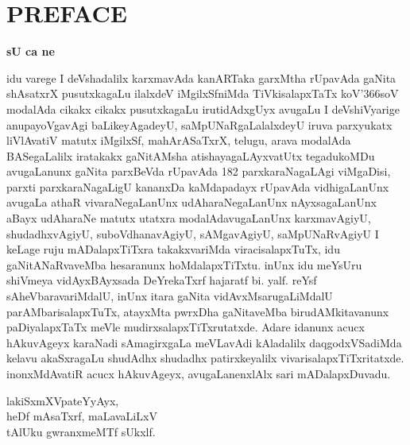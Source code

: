 \chapter{{\rm\bfseries PREFACE}}

\begin{center}
{\LARGE\bfseries sU ca ne}
\end{center}

idu varege I deVshadalilx karxmavAda kanARTaka garxMtha rUpavAda gaNita shAsatxrX pusutxkagaLu ilalxdeV iMgilxSfniMda TiVkisalapxTaTx koV\char'366soV modalAda cikakx cikakx pusutxkagaLu irutidAdxgUyx avugaLu I deVshiVyarige anupayoVgavAgi baLikeyAgadeyU, saMpUNaRgaLalalxdeyU iruva parxyukatx liVlAvatiV matutx iMgilxSf, mahArASaTxrX, telugu, arava modalAda BASegaLalilx iratakakx gaNitAMsha atishayagaLAyxvatUtx tegadukoMDu avugaLanunx gaNita parxBeVda rUpavAda {\rm 182} parxkaraNagaLAgi viMgaDisi, parxti parxkaraNagaLigU kananxDa kaMdapadayx rUpavAda vidhigaLanUnx avugaLa athaR vivaraNegaLanUnx udAharaNegaLanUnx nAyxsagaLanUnx aBayx udAharaNe matutx utatxra modalAdavugaLanUnx karxmavAgiyU, shudadhxvAgiyU, suboVdhanavAgiyU, sAMgavAgiyU, saMpUNaRvAgiyU I keLage ruju mADalapxTiTxra takakxvariMda viracisalapxTuTx, idu gaNitANaRvaveMba hesaranunx hoMdalapxTiTxtu. inUnx idu meYsUru shiVmeya vidAyxBAyxsada DeYrekaTxrf hajaratf bi. yalf. reYsf sAheVbaravariMdalU, inUnx itara gaNita vidAvxMsarugaLiMdalU parAMbarisalapxTuTx, atayxMta pwrxDha gaNitaveMba birudAMkitavanunx paDiyalapxTaTx meVle mudirxsalapxTiTxrutatxde. Adare idanunx acucx hAkuvAgeyx karaNadi sAmagirxgaLa meVLavAdi kAladalilx daqgodxVSadiMda kelavu akaSxragaLu shudAdhx shudadhx patirxkeyalilx vivarisalapxTiTxritatxde. inonxMdAvatiR acucx hAkuvAgeyx, avugaLanenxlAlx sari mADalapxDuvadu.
\bigskip

\begin{flushright}
lakiSxmXVpateYyAyx,\\
heDf mAsaTxrf, maLavaLiLxV\\
tAlUku gwranxmeMTf sUkxlf.
\end{flushright}
